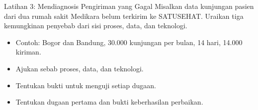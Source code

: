 \documentclass[aspectratio=169, table, 12pt]{beamer}
\begin{document}
\begin{frame}{{\Large Latihan 3: Mendiagnosis Pengiriman yang Gagal}}
  \vspace{8pt}
  Misalkan data kunjungan pasien dari dua rumah sakit Medikara belum terkirim ke SATUSEHAT. Uraikan tiga kemungkinan penyebab dari sisi proses, data, dan teknologi.
  \vspace{6pt}
  \begin{itemize}
    \item Contoh: Bogor dan Bandung, 30.000 kunjungan per bulan, 14 hari, 14.000 kiriman.
    \item Ajukan sebab proses, data, dan teknologi.
    \item Tentukan bukti untuk menguji setiap dugaan.
    \item Tentukan dugaan pertama dan bukti keberhasilan perbaikan.
  \end{itemize}
\end{frame}
\end{document}
